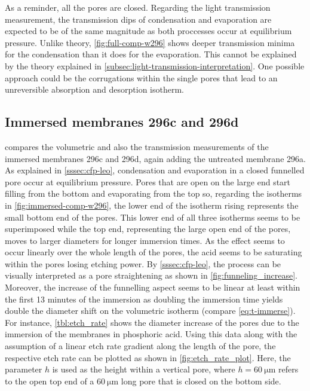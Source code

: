 \documentclass[thesis.tex]{subfiles}
\begin{document}
          As a reminder, all the pores are closed. Regarding the light transmission measurement, the transmission dips of condensation and evaporation are expected to be of the same magnitude as both proccesses occur at equilibrium pressure. Unlike theory, \cref{fig:full-comp-w296} shows deeper transmission minima for the condensation than it does for the evaporation. This cannot be explained by the theory explained in \cref{subsec:light-transmission-interpretation}. One possible approach could be the corrugations within the single pores that lead to an unreversible absorption and desorption isotherm.

          


      \subsection{Immersed membranes 296c and 296d}
      \label{subsec:immersed-membranes}

          

           compares the volumetric and also the transmission measurements of the immersed membranes 296c and 296d, again adding the untreated membrane 296a. As explained in \cref{sssec:cfp-leo}, condensation and evaporation in a closed funnelled pore occur at equilibrium pressure. Pores that are open on the large end start filling from the bottom and evaporating from the top so, regarding the isotherms in \cref{fig:immersed-comp-w296}, the lower end of the isotherm rising represents the small bottom end of the pores. This lower end of all three isotherms seems to be superimposed while the top end, representing the large open end of the pores, moves to larger diameters for longer immersion times. As the effect seems to occur linearly over the whole length of the pores, the acid seems to be saturating within the pores losing etching power. By \cref{sssec:cfp-leo}, the process can be visually interpreted as a pore straightening as shown in \cref{fig:funneling_increase}. Moreover, the increase of the funnelling aspect seems to be linear at least within the first 13 minutes of the immersion as doubling the immersion time yields double the diameter shift on the volumetric isotherm (compare \cref{eq:t-immerse}). For instance, \cref{tbl:etch_rate} shows the diameter increase of the pores due to the immersion of the membranes in phosphoric acid. Using this data along with the assumption of a linear etch rate gradient along the length of the pore, the respective etch rate can be plotted as shown in \cref{fig:etch_rate_plot}. Here, the parameter $h$ is used as the height within a vertical pore, where $h=\SI{60}{\micro\meter}$ refers to the open top end of a $\SI{60}{\micro\meter}$ long pore that is closed on the bottom side.
\end{document}
